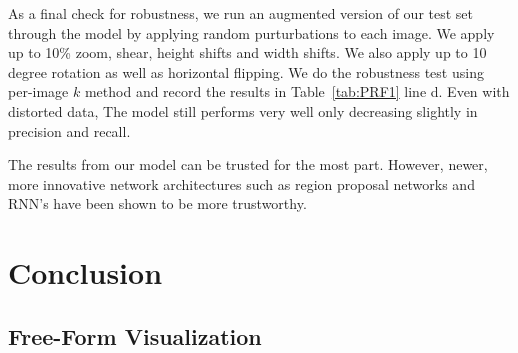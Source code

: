 \documentclass[12pt,journal,compsoc]{IEEEtran}
\begin{document}
As a final check for robustness, we run an augmented version of our test set through the model by applying random purturbations to each image. We apply up to 10\% zoom, shear, height shifts and width shifts. We also apply up to 10 degree rotation as well as horizontal flipping. We do the robustness test using per-image $k$ method and record the results in Table~\ref{tab:PRF1} line d. Even with distorted data, The model still performs very well only decreasing slightly in precision and recall.

The results from our model can be trusted for the most part. However, newer, more innovative network architectures such as region proposal networks and RNN's have been shown to be more trustworthy.






\section{Conclusion} %
\subsection{Free-Form Visualization}
\end{document}
